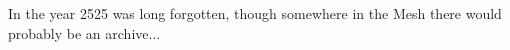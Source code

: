 
In the year 2525 \citep{ep2e_1.1_2019} was long forgotten, though somewhere in the \gls{Mesh} there would probably be an archive...
